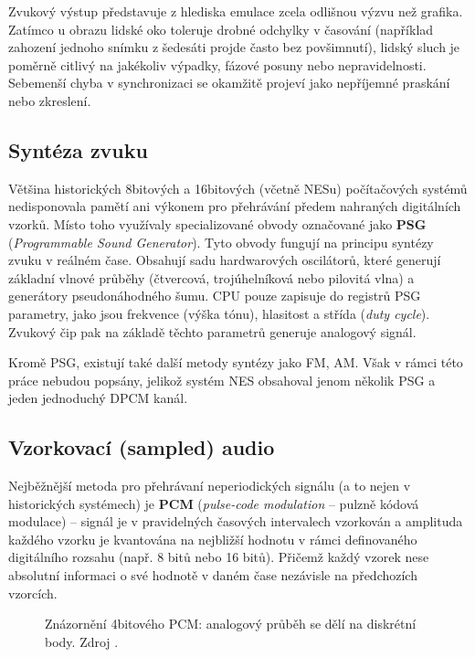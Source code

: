 Zvukový výstup představuje z hlediska emulace zcela odlišnou výzvu než grafika. Zatímco u obrazu
lidské oko toleruje drobné odchylky v časování (například zahození jednoho snímku z šedesáti projde
často bez povšimnutí), lidský sluch je poměrně citlivý na jakékoliv výpadky, fázové posuny nebo
nepravidelnosti. Sebemenší chyba v synchronizaci se okamžitě projeví jako nepříjemné praskání
nebo zkreslení.

\subsection{Syntéza zvuku}

Většina historických 8bitových a 16bitových (včetně NESu) počítačových systémů nedisponovala pamětí
ani výkonem pro přehrávání předem nahraných digitálních vzorků. Místo toho využívaly specializované
obvody označované jako \textbf{PSG} (\textit{Programmable Sound Generator}). Tyto obvody fungují na
principu syntézy zvuku v reálném čase. Obsahují sadu hardwarových oscilátorů, které generují
základní vlnové průběhy (čtvercová, trojúhelníková nebo pilovitá vlna) a generátory
pseudonáhodného šumu. CPU pouze zapisuje do registrů PSG parametry, jako jsou frekvence (výška
tónu), hlasitost a střída (\textit{duty cycle}). Zvukový čip pak na základě těchto parametrů
generuje analogový signál.

Kromě PSG, existují také další metody syntézy jako FM, AM. Však v rámci této práce nebudou popsány,
jelikož systém NES obsahoval jenom několik PSG a jeden jednoduchý DPCM kanál.

\subsection{Vzorkovací (sampled) audio}

Nejběžnější metoda pro přehrávaní neperiodických signálu (a to nejen v historických systémech) je
\textbf{PCM} (\textit{pulse-code modulation} -- pulzně kódová modulace) -- signál je v pravidelných
časových intervalech vzorkován a amplituda každého vzorku je kvantována na nejbližší hodnotu v rámci
definovaného digitálního rozsahu (např. 8 bitů nebo 16 bitů). Přičemž každý vzorek nese absolutní
informaci o své hodnotě v daném čase nezávisle na předchozích vzorcích.

\begin{figure}[H]
    \centering
    
    \caption{Znázornění 4bitového PCM: analogový průběh se dělí na diskrétní body.
        Zdroj \cite{pcm}.}
    \label{fig:pcm}
\end{figure}

